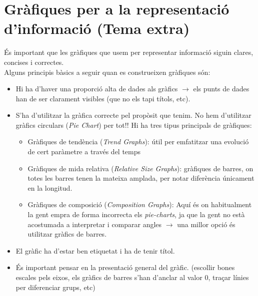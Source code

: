 \documentclass[12pt]{article}
\begin{document}
    \section{Gràfiques per a la representació d'informació (Tema extra)}
    És important que les gràfiques que usem per representar informació siguin clares, concises i correctes.\\
    Alguns principis bàsics a seguir quan es construeixen gràfiques són:
    \begin{itemize}
        \item Hi ha d'haver una proporció alta de dades als gràfics $\rightarrow$ els punts de dades han de ser clarament visibles (que no els tapi títols, etc).
        \item S'ha d'utilitzar la gràfica correcte pel propòsit que tenim. No hem d'utilitzar gràfics circulars (\textit{Pie Chart}) per tot!! Hi ha tres tipus principals de gràfiques:
        \begin{itemize}
            \item Gràfiques de tendència (\textit{Trend Graphs}): útil per emfatitzar una evolució de cert paràmetre a través del temps
            \item Gràfiques de mida relativa (\textit{Relative Size Graphs}): gràfiques de barres, on totes les barres tenen la mateixa amplada, per notar diferència únicament en la longitud.
            \item Gràfiques de composició (\textit{Composition Graphs}): Aquí és on habitualment la gent empra de forma incorrecta els \textit{pie-charts}, ja que la gent no està acostumada a
            interpretar i comparar angles $\rightarrow$ una millor opció és utilitzar gràfics de barres.

        \end{itemize}
        \item El gràfic ha d'estar ben etiquetat i ha de tenir títol.
        \item És important pensar en la presentació general del gràfic. (escollir bones escales pels eixos, els gràfics de barres s'han d'anclar al valor 0, traçar línies per diferenciar grups, etc)
    \end{itemize}
\end{document}
